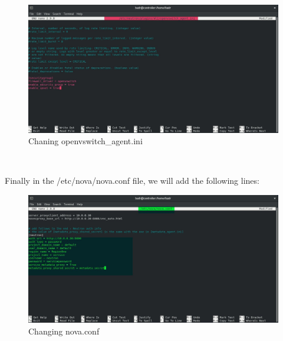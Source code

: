 \begin{spacing}{1.2}
\begin{figure}[!htb] 
\begin{center} 
\includegraphics[width=1\linewidth]{Cloud/Installing and Configuring Neutron services/Chaning openvswitch_agent.ini} 
\end{center} 
\caption{Chaning openvswitch_agent.ini} 
\end{figure} 
\FloatBarrier
\\
\par Finally in the /etc/nova/nova.conf file, we will add the following lines:
\\
\begin{figure}[!htb] 
\begin{center} 
\includegraphics[width=1\linewidth]{Cloud/Installing and Configuring Neutron services/Changing nova.conf} 
\end{center} 
\caption{Changing nova.conf} 
\end{figure} 
\FloatBarrier
\\


\end{spacing}
